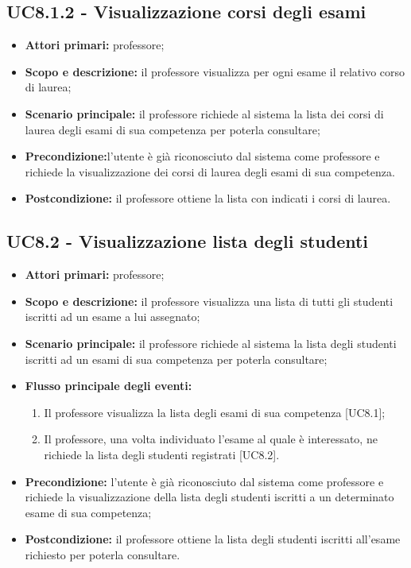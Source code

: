 \documentclass[AnalisiDeiRequisiti.tex]{subfiles}
\begin{document}
\subsection{UC8.1.2 - Visualizzazione corsi degli esami}
\begin{itemize}
	\item \textbf{Attori primari:} professore;
	\item \textbf{Scopo e descrizione:} il professore visualizza per ogni esame il relativo corso di laurea;
	\item \textbf{Scenario principale:} il professore richiede al sistema la lista dei corsi di laurea degli esami di sua competenza per poterla consultare;
	\item \textbf{Precondizione:}l'utente è già riconosciuto dal sistema come professore e richiede la visualizzazione dei corsi di laurea degli esami di sua competenza.
	\item \textbf{Postcondizione:} il professore ottiene la lista con indicati i corsi di laurea.
\end{itemize}

\subsection{UC8.2 - Visualizzazione lista degli studenti}
\begin{itemize}
	\item \textbf{Attori primari:} professore;
	\item \textbf{Scopo e descrizione:} il professore visualizza una lista di tutti gli studenti iscritti ad un esame a lui assegnato;
	\item \textbf{Scenario principale:} il professore richiede al sistema la lista degli studenti iscritti ad un esami di sua competenza per poterla consultare;
	\item \textbf{Flusso principale degli eventi:}
	\begin{enumerate}
		\item Il professore visualizza la lista degli esami di sua competenza [UC8.1];
		\item Il professore, una volta individuato l'esame al quale è interessato, ne richiede la lista degli studenti registrati [UC8.2].
	\end{enumerate}
	\item \textbf{Precondizione:} l'utente è già riconosciuto dal sistema come professore e richiede la visualizzazione della lista degli studenti iscritti a un determinato esame di sua competenza;
	\item \textbf{Postcondizione:} il professore ottiene la lista degli studenti iscritti all'esame richiesto per poterla consultare.
\end{itemize}
\end{document}
